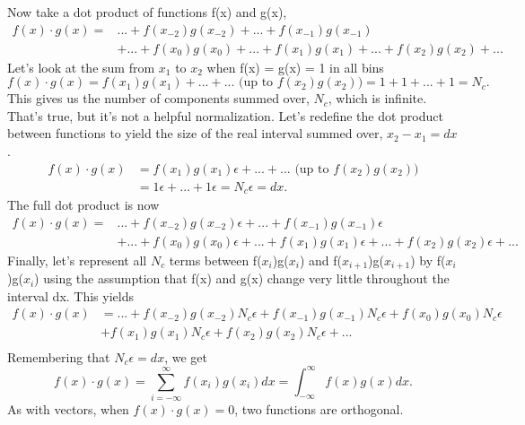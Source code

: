 \documentclass[12pt]{article}
\begin{document}
Now take a dot product of functions f(x) and g(x), 
\begin{equation}
\begin{split}
f(x) \cdot g(x) = & ... + f(x_{-2})g(x_{-2}) + ... + f(x_{-1})g(x_{-1}) \\ 
&+ ... + f(x_0)g(x_0) + ... + f(x_1)g(x_1) + ... + f(x_2)g(x_2) + ...
\end{split}
\end{equation}
Let's look at the sum from $x_1$ to $x_{2}$ when f(x) = g(x) = 1 in all bins 
\begin{equation}
f(x) \cdot g(x) = f(x_1)g(x_1) + ... + ... \text{ (up to } f(x_2)g(x_2)) = 1 + 1 + ... + 1 = N_c.
\end{equation}
This gives us the number of components summed over, $N_c$, which is infinite. That's true, but it's not a helpful normalization. Let's redefine the dot product between functions to yield the size of the real interval summed over, $x_2 - x_1 = dx$. 
\begin{equation}
\begin{split}
f(x) \cdot g(x) &= f(x_1)g(x_1)\epsilon + ... + ... \text{ (up to } f(x_2)g(x_2)) \\ 
& = 1\epsilon + ... + 1\epsilon = N_c\epsilon = dx.
\end{split}
\end{equation}
The full dot product is now
\begin{equation}
\begin{split}
f(x) \cdot g(x) = &... + f(x_{-2})g(x_{-2})\epsilon + ... + f(x_{-1})g(x_{-1})\epsilon \\ 
&+ ... + f(x_0)g(x_0)\epsilon + ... + f(x_1)g(x_1)\epsilon + ... + f(x_2)g(x_2)\epsilon + ...
\end{split}
\end{equation}
Finally, let's represent all $N_c$ terms between f($x_i$)g($x_i$) and f($x_{i+1}$)g($x_{i+1}$) by f($x_i$)g($x_i$) using the assumption that f(x) and g(x) change very little throughout the interval dx. This yields 
\begin{equation}
\begin{split}
f(x) \cdot g(x) &= ... + f(x_{-2})g(x_{-2})N_c\epsilon + f(x_{-1})g(x_{-1})N_c\epsilon + f(x_0)g(x_0)N_c\epsilon \\ 
&+ f(x_1)g(x_1)N_c\epsilon + f(x_2)g(x_2)N_c\epsilon + ... \\ 
\end{split}
\end{equation}
Remembering that $N_c\epsilon = dx$, we get
\begin{equation}
f(x) \cdot g(x) = \sum_{i=-\infty}^{\infty} f(x_i)g(x_i) dx = \int_{-\infty}^{\infty} f(x)g(x)dx.
\end{equation}
As with vectors, when $f(x) \cdot g(x) = 0$, two functions are orthogonal. 
\end{document}
